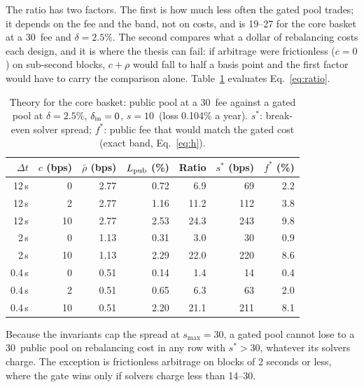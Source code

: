 The ratio has two factors. The first is how much less often the gated pool trades; it depends on the fee and the band, not on costs, and is 19--27 for the core basket at a 30\bps\ fee and $\delta=2.5\%$. The second compares what a dollar of rebalancing costs each design, and it is where the thesis can fail: if arbitrage were frictionless ($c=0$) on sub-second blocks, $c+\rho$ would fall to half a basis point and the first factor would have to carry the comparison alone. Table~\ref{tab:theory} evaluates Eq.~\eqref{eq:ratio}.

\begin{table}[t]
\centering\footnotesize\setlength{\tabcolsep}{3.2pt}
\caption{Theory for the core basket: public pool at a 30\bps\ fee against a gated pool at $\delta=2.5\%$, $\delta_{\mathrm{in}}=0$, $s=10$\bps\ (loss 0.104\% a year). $s^{*}$: break-even solver spread; $f^{*}$: public fee that would match the gated cost (exact band, Eq.~\ref{eq:h}).}
\label{tab:theory}
\begin{tabular}{rrrrrrr}
\toprule
$\Delta t$ & $c$ (bps) & $\bar\rho$ (bps) & $L_{\mathrm{pub}}$ (\%) & Ratio & $s^{*}$ (bps) & $f^{*}$ (\%)\\
\midrule
12\,s & 0 & 2.77 & 0.72 & 6.9 & 69 & 2.2\\
12\,s & 2 & 2.77 & 1.16 & 11.2 & 112 & 3.8\\
12\,s & 10 & 2.77 & 2.53 & 24.3 & 243 & 9.8\\
2\,s & 0 & 1.13 & 0.31 & 3.0 & 30 & 0.9\\
2\,s & 10 & 1.13 & 2.29 & 22.0 & 220 & 8.6\\
0.4\,s & 0 & 0.51 & 0.14 & 1.4 & 14 & 0.4\\
0.4\,s & 2 & 0.51 & 0.65 & 6.3 & 63 & 2.0\\
0.4\,s & 10 & 0.51 & 2.20 & 21.1 & 211 & 8.1\\
\bottomrule
\end{tabular}
\end{table}

Because the invariants cap the spread at $s_{\max}=30$\bps, a gated pool cannot lose to a 30\bps\ public pool on rebalancing cost in any row with $s^{*}>30$\bps, whatever its solvers charge. The exception is frictionless arbitrage on blocks of 2 seconds or less, where the gate wins only if solvers charge less than 14--30\bps.
